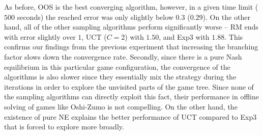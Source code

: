 As before, OOS is the best converging algorithm, however, in a given time limit ($500$ seconds) the reached error was only slightly below $0.3$ ($0.29$). On the other hand, all of the other sampling algorithms perform significantly worse -- RM ends with error slightly over $1$, UCT ($C=2$) with $1.50$, and Exp3 with $1.88$.
This confirms our findings from the previous experiment that increasing the branching factor slows down the convergence rate.
Secondly, since there is a pure Nash equilibrium in this particular game configuration, the convergence of the algorithms is also slower since they essentially mix the strategy during the iterations in order to explore the unvisited parts of the game tree. Since none of the sampling algorithms can directly exploit this fact, their performance in offline solving of games like Oshi-Zumo is not compelling. On the other hand, the existence of pure NE explains the better performance of UCT compared to Exp3 that is forced to explore more broadly.


